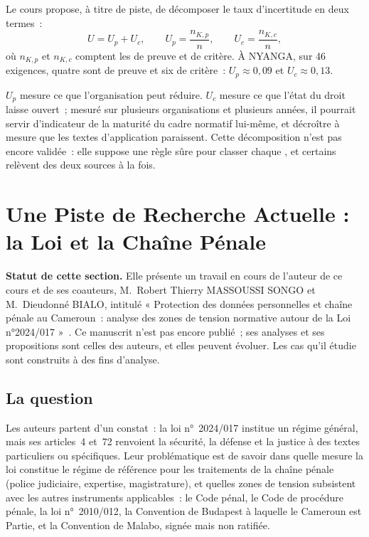 Le cours propose, à titre de piste, de décomposer le taux d'incertitude en
deux termes~:
\[
U = U_p + U_c, \qquad U_p = \frac{n_{K,p}}{n}, \qquad U_c = \frac{n_{K,c}}{n},
\]
où $n_{K,p}$ et $n_{K,c}$ comptent les \NEK{} de preuve et de critère. À
NYANGA, sur 46 exigences, quatre \NEK{} sont de preuve et six de critère~:
$U_p \approx 0{,}09$ et $U_c \approx 0{,}13$.

$U_p$ mesure ce que l'organisation peut réduire. $U_c$ mesure ce que l'état
du droit laisse ouvert~; mesuré sur plusieurs organisations et plusieurs
années, il pourrait servir d'indicateur de la maturité du cadre normatif
lui-même, et décroître à mesure que les textes d'application paraissent.
Cette décomposition n'est pas encore validée~: elle suppose une règle sûre
pour classer chaque \NEK{}, et certains relèvent des deux sources à la
fois.

\section{Une Piste de Recherche Actuelle : la Loi et la Chaîne Pénale}
\label{sec:c16-piste}

\begin{boxinfo}
\textbf{Statut de cette section.} Elle présente un travail en cours de
l'auteur de ce cours et de ses coauteurs, M.~Robert Thierry MASSOUSSI SONGO
et M.~Dieudonné BIALO, intitulé « Protection des données personnelles et
chaîne pénale au Cameroun~: analyse des zones de tension normative autour
de la Loi n°2024/017 »~\cite{minka2026chainepenale}. Ce manuscrit n'est pas
encore publié~; ses analyses et ses propositions sont celles des auteurs,
et elles peuvent évoluer. Les cas qu'il étudie sont construits à des fins
d'analyse.
\end{boxinfo}

\subsection{La question}

Les auteurs partent d'un constat~: la loi n°~2024/017 institue un régime
général, mais ses articles~4 et~72 renvoient la sécurité, la défense et la
justice à des textes particuliers ou spécifiques. Leur problématique est
de savoir dans quelle mesure la loi constitue le régime de référence pour
les traitements de la chaîne pénale (police judiciaire, expertise,
magistrature), et quelles zones de tension subsistent avec les autres
instruments applicables~: le Code pénal, le Code de procédure pénale, la
loi n°~2010/012, la Convention de Budapest à laquelle le Cameroun est
Partie, et la Convention de Malabo, signée mais non ratifiée.

